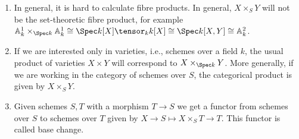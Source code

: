 \begin{enumerate}
	\item In general, it is hard to calculate fibre products. In general,
		$X\times_S Y$ will not be the set-theoretic fibre product, for example
		$\mathbb{A}_k^1\times_{\Spec k}\mathbb{A}_k^1 \cong \Spec k[X]\tensor_k k[X] \cong \Spec k[X, Y] \cong \mathbb{A}_k^2 $.
	\item If we are interested only in varieties, i.e., schemes over a field $k$, the usual
		product of varieties $X\times Y$ will correspond to $X\times_{\Spec k} Y$.
		More generally, if we are working in the category of schemes over $S$, the
		categorical product is given by $X\times_S Y$.
	\item Given schemes $S, T$ with a morphism $T\to S$ we get a functor from schemes
		over $S$ to schemes over $T$ given by $X\to S\mapsto X\times_S T\to T$. This
		functor is called base change.
\end{enumerate}
